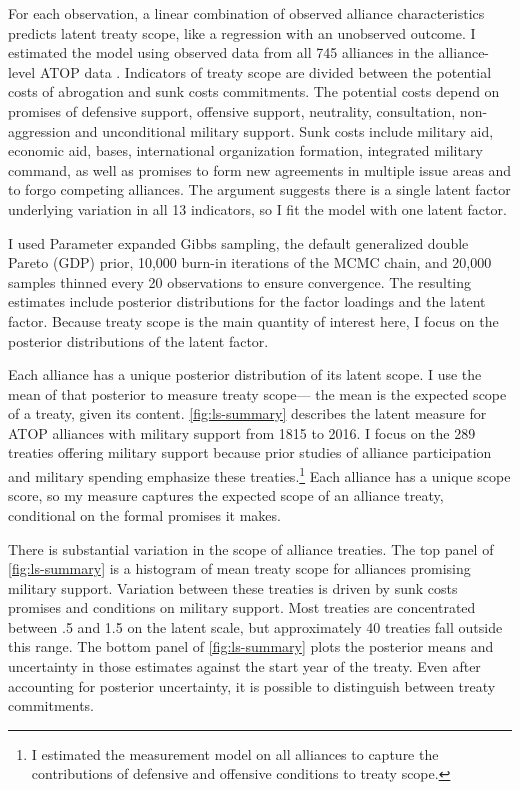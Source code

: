 \documentclass[12pt]{article}
\begin{document}
For each observation, a linear combination of observed alliance characteristics predicts latent treaty scope, like a regression with an unobserved outcome.  
I estimated the model using observed data from all 745 alliances in the alliance-level ATOP data \citep{Leedsetal2002}. 
Indicators of treaty scope are divided between the potential costs of abrogation and sunk costs commitments.
The potential costs depend on promises of defensive support, offensive support, neutrality, consultation, non-aggression and unconditional military support. 
Sunk costs include military aid, economic aid, bases, international organization formation, integrated military command, as well as promises to form new agreements in multiple issue areas and to forgo competing alliances. 
The argument suggests there is a single latent factor underlying variation in all 13 indicators, so I fit the model with one latent factor. 


I used Parameter expanded Gibbs sampling, the default generalized double Pareto (GDP) prior, 10,000 burn-in iterations of the MCMC chain, and 20,000 samples thinned every 20 observations to ensure convergence. 
The resulting estimates include posterior distributions for the factor loadings and the latent factor. 
Because treaty scope is the main quantity of interest here, I focus on the posterior distributions of the latent factor. 


Each alliance has a unique posterior distribution of its latent scope. 
I use the mean of that posterior to measure treaty scope--- the mean is the expected scope of a treaty, given its content. 
\autoref{fig:ls-summary} describes the latent measure for ATOP alliances  with military support from 1815 to 2016.
I focus on the 289 treaties offering military support because prior studies of alliance participation and military spending emphasize these treaties.\footnote{
I estimated the measurement model on all alliances to capture the contributions of defensive and offensive conditions to treaty scope.}
Each alliance has a unique scope score, so my measure captures the expected scope of an alliance treaty, conditional on the formal promises it makes. 


There is substantial variation in the scope of alliance treaties. 
The top panel of \autoref{fig:ls-summary} is a histogram of mean treaty scope for alliances promising military support. 
Variation between these treaties is driven by sunk costs promises and conditions on military support. 
Most treaties are concentrated between .5 and 1.5 on the latent scale, but approximately 40 treaties fall outside this range. 
The bottom panel of \autoref{fig:ls-summary} plots the posterior means and uncertainty in those estimates against the start year of the treaty. 
Even after accounting for posterior uncertainty, it is possible to distinguish between treaty commitments. 
\end{document}
